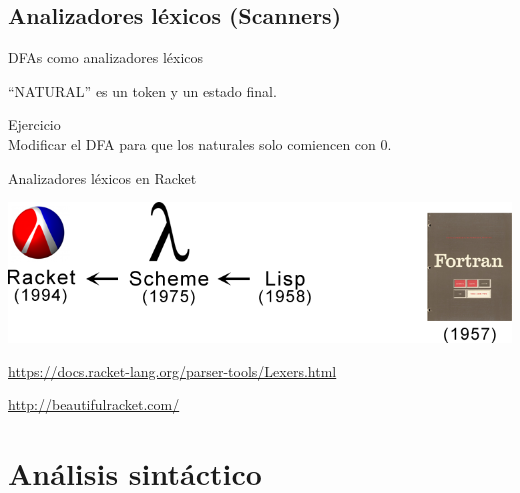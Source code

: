 \documentclass[handout]{beamer} %
\begin{document}
\subsection{Analizadores léxicos (Scanners)}

\begin{frame}{DFAs como analizadores léxicos}
    \begin{center}
   \end{center}
   ``NATURAL'' es un token y un estado final.
   \medskip\pause
   
   \alert{Ejercicio}\\
   Modificar el DFA para que los naturales solo comiencen con 0.
\end{frame}

\begin{frame}{Analizadores léxicos en Racket}
    \begin{center}
      \includegraphics[width=.8\textwidth]{./image/cap2/racket-history}
      
      \url{https://docs.racket-lang.org/parser-tools/Lexers.html}
      \medskip
      
      \url{http://beautifulracket.com/}
    \end{center}
\end{frame}

\section{Análisis sintáctico}
\end{document}
